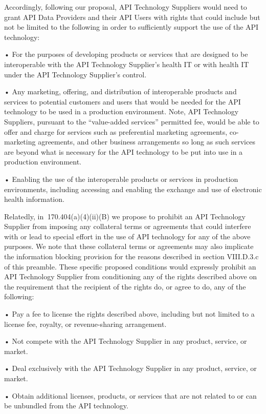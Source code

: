 \documentclass[twoside,11pt]{article}
\begin{document}
          Accordingly, following our proposal, API Technology Suppliers would need to grant API Data Providers and their API Users with rights that could include but not be limited to the following in order to sufficiently support the use of the API technology:


          • For the purposes of developing products or services that are designed to be interoperable with the API Technology Supplier's health IT or with health IT under the API Technology Supplier's control.


          • Any marketing, offering, and distribution of interoperable products and services to potential customers and users that would be needed for the API technology to be used in a production environment. Note, API Technology Suppliers, pursuant to the “value-added services” permitted fee, would be able to offer and charge for services such as preferential marketing agreements, co-marketing agreements, and other business arrangements so long as such services are beyond what is necessary for the API technology to be put into use in a production environment.


          • Enabling the use of the interoperable products or services in production environments, including accessing and enabling the exchange and use of electronic health information.


          Relatedly, in \textsection{} 170.404(a)(4)(ii)(B) we propose to prohibit an API Technology Supplier from imposing any collateral terms or agreements that could interfere with or lead to special effort in the use of API technology for any of the above purposes. We note that these collateral terms or agreements may also implicate the information blocking provision for the reasons described in section VIII.D.3.c of this preamble. These specific proposed conditions would expressly prohibit an API Technology Supplier from conditioning any of the rights described above on the requirement that the recipient of the rights do, or agree to do, any of the following:


          • Pay a fee to license the rights described above, including but not limited to a license fee, royalty, or revenue-sharing arrangement.


          • Not compete with the API Technology Supplier in any product, service, or market.


          • Deal exclusively with the API Technology Supplier in any product, service, or market.


          • Obtain additional licenses, products, or services that are not related to or can be unbundled from the API technology.
\end{document}
